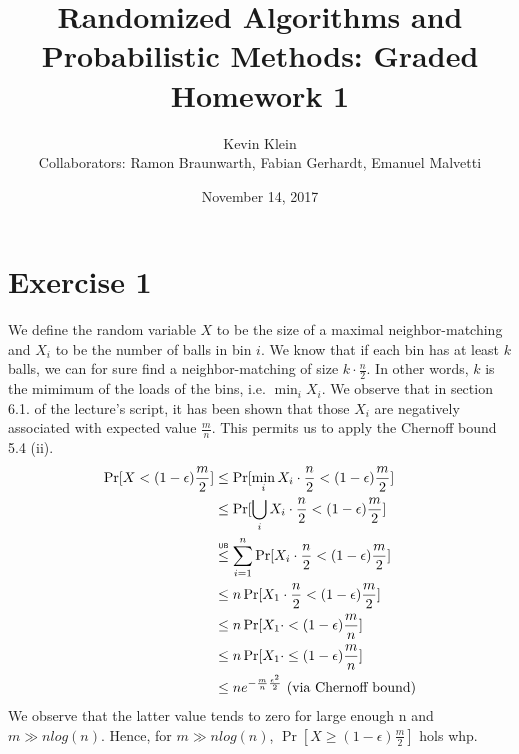\documentclass[a4paper,german]{article}
\title{Randomized Algorithms and Probabilistic Methods: Graded Homework 1}
\author{ Kevin Klein\\Collaborators: Ramon Braunwarth, Fabian Gerhardt, Emanuel Malvetti}
\date{November 14, 2017}
\newcommand\ub{\mathrel{\overset{\makebox[0pt]{\mbox{\normalfont\tiny\sffamily UB}}}{\leq}}}
\begin{document}
\maketitle

\section*{Exercise 1}
We define the random variable \(X\) to be the size of a maximal neighbor-matching and \(X_i\) to be the number of balls in bin \(i\). We know that if each bin has at least \(k\) balls, we can for sure find a neighbor-matching of size \(k \cdot \frac{n}{2}\). In other words, \(k\) is the mimimum of the loads of the bins, i.e. \(\min_i X_i\). We observe that in section 6.1. of the lecture's script, it has been shown that those \(X_i\) are negatively associated with expected value \(\frac{m}{n}\). This permits us to apply the Chernoff bound 5.4 (ii).
\begin{align*}
\Pr[X < (1-\epsilon)\frac{m}{2}] &\leq \Pr[\min_i X_i \cdot \frac{n}{2} < (1 - \epsilon) \frac{m}{2}] \\
& \leq \Pr[\bigcup_i X_i \cdot \frac{n}{2} < (1 - \epsilon) \frac{m}{2}] \\
& \ub \sum_{i=1}^n  \Pr[X_i \cdot \frac{n}{2} < (1 - \epsilon) \frac{m}{2}] \\
& \leq n  \Pr[X_1 \cdot \frac{n}{2} < (1 - \epsilon) \frac{m}{2}] \\
& \leq n  \Pr[X_1 \cdot < (1 - \epsilon) \frac{m}{n}] \\
& \leq n  \Pr[X_1 \cdot \leq (1 - \epsilon) \frac{m}{n}] \\
& \leq n e^{-\frac{m}{n} \frac{\epsilon^2}{2}} \text{     (via Chernoff bound)} \\
\end{align*}
We observe that the latter value tends to zero for large enough n and \(m \gg nlog(n)\). Hence, for \(m \gg nlog(n)\), \( \Pr[X \geq (1-\epsilon)\frac{m}{2}] \) hols whp.
\end{document}
